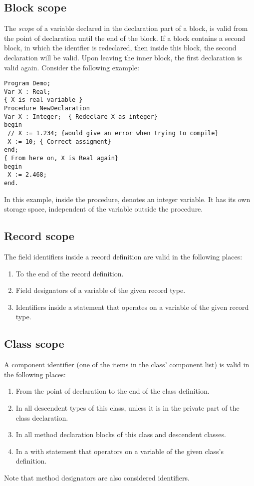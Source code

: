 \subsection{Block scope}
The {\em scope} of a variable declared in the declaration part of a block,
is valid from the point of declaration until the end of the block.
If a block contains a second block, in which the identfier is
redeclared, then inside this block, the second declaration will be valid.
Upon leaving the inner block, the first declaration is valid again.
Consider the following example:
\begin{verbatim}
Program Demo;
Var X : Real;
{ X is real variable }
Procedure NewDeclaration
Var X : Integer;  { Redeclare X as integer}
begin
 // X := 1.234; {would give an error when trying to compile}
 X := 10; { Correct assigment}
end;
{ From here on, X is Real again}
begin
 X := 2.468;
end.
\end{verbatim}
In this example, inside the procedure,  denotes an integer variable.
It has its own storage space, independent of the variable  outside
the procedure.

\subsection{Record scope}
The field identifiers inside a record definition are valid in the following
places:
\begin{enumerate}
\item To the end of the record definition.
\item Field designators of a variable of the given record type.
\item Identifiers inside a  statement that operates on a variable
of the given record type.
\end{enumerate}

\subsection{Class scope}
A component identifier (one of the items in the class' component list) 
is valid in the following places:
\begin{enumerate}
\item From the point of declaration to the end of the class definition.
\item In all descendent types of this class, unless it is in the private
part of the class declaration.
\item In all method declaration blocks of this class and descendent classes.
\item In a with statement that operators on a variable of the given class's
definition.
\end{enumerate}
Note that method designators are also considered identifiers.
